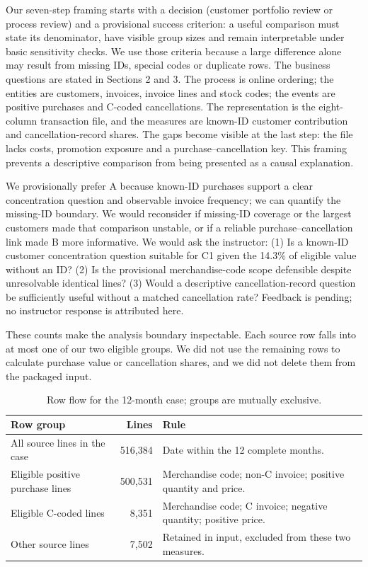 \documentclass[10pt,a4paper]{article}
\newcommand{\sectionhead}[1]{\vspace{0.34em}{\large\bfseries\color{navy}#1}\par\vspace{0.08em}}
\newcommand{\subhead}[1]{\vspace{0.18em}{\bfseries #1}\par}
\begin{document}
\subhead{Decision framing}
Our seven-step framing starts with a decision (customer portfolio review or process review) and a provisional success criterion: a useful comparison must state its denominator, have visible group sizes and remain interpretable under basic sensitivity checks. We use those criteria because a large difference alone may result from missing IDs, special codes or duplicate rows. The business questions are stated in Sections 2 and 3. The process is online ordering; the entities are customers, invoices, invoice lines and stock codes; the events are positive purchases and C-coded cancellations. The representation is the eight-column transaction file, and the measures are known-ID customer contribution and cancellation-record shares. The gaps become visible at the last step: the file lacks costs, promotion exposure and a purchase--cancellation key. This framing prevents a descriptive comparison from being presented as a causal explanation.

We provisionally prefer A because known-ID purchases support a clear concentration question and observable invoice frequency; we can quantify the missing-ID boundary. We would reconsider if missing-ID coverage or the largest customers made that comparison unstable, or if a reliable purchase--cancellation link made B more informative. We would ask the instructor: (1) Is a known-ID customer concentration question suitable for C1 given the 14.3\% of eligible value without an ID? (2) Is the provisional merchandise-code scope defensible despite unresolvable identical lines? (3) Would a descriptive cancellation-record question be sufficiently useful without a matched cancellation rate? Feedback is pending; no instructor response is attributed here.

\sectionhead{5\quad Measurement notes}
These counts make the analysis boundary inspectable. Each source row falls into at most one of our two eligible groups. We did not use the remaining rows to calculate purchase value or cancellation shares, and we did not delete them from the packaged input.

\begin{table}[H]\centering\small
\caption{Row flow for the 12-month case; groups are mutually exclusive.}
\begin{tabularx}{\linewidth}{@{}>{\raggedright\arraybackslash}Xr>{\raggedright\arraybackslash}X@{}}\toprule
Row group & Lines & Rule \\\midrule
All source lines in the case & 516,384 & Date within the 12 complete months. \\
Eligible positive purchase lines & 500,531 & Merchandise code; non-C invoice; positive quantity and price. \\
Eligible C-coded lines & 8,351 & Merchandise code; C invoice; negative quantity; positive price. \\
Other source lines & 7,502 & Retained in input, excluded from these two measures. \\
\bottomrule\end{tabularx}
\end{table}
\end{document}
